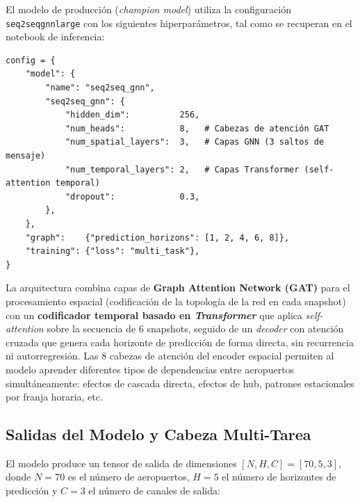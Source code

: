 \documentclass[12pt,oneside,a4paper]{report}
\renewcommand{\_}{\textunderscore\allowbreak}
\begin{document}
El modelo de producción (\textit{champion model}) utiliza la configuración \texttt{seq2seq\_gnn\_large} con los siguientes hiperparámetros, tal como se recuperan en el notebook de inferencia:

\begin{lstlisting}[style=pystyle, caption={Configuración del modelo Seq2SeqGNN campeón.}]
config = {
    "model": {
        "name": "seq2seq_gnn",
        "seq2seq_gnn": {
            "hidden_dim":          256,
            "num_heads":           8,   # Cabezas de atención GAT
            "num_spatial_layers":  3,   # Capas GNN (3 saltos de mensaje)
            "num_temporal_layers": 2,   # Capas Transformer (self-attention temporal)
            "dropout":             0.3,
        },
    },
    "graph":    {"prediction_horizons": [1, 2, 4, 6, 8]},
    "training": {"loss": "multi_task"},
}
\end{lstlisting}

La arquitectura combina capas de \textbf{Graph Attention Network (GAT)} para el procesamiento espacial (codificación de la topología de la red en cada snapshot) con un \textbf{codificador temporal basado en \textit{Transformer}} que aplica \textit{self-attention} sobre la secuencia de 6 snapshots, seguido de un \textit{decoder} con atención cruzada que genera cada horizonte de predicción de forma directa, sin recurrencia ni autorregresión. Las 8 cabezas de atención del encoder espacial permiten al modelo aprender diferentes tipos de dependencias entre aeropuertos simultáneamente: efectos de cascada directa, efectos de hub, patrones estacionales por franja horaria, etc.

\subsection{Salidas del Modelo y Cabeza Multi-Tarea}
\label{sub:salidas_modelo}

El modelo produce un tensor de salida de dimensiones $[N, H, C] = [70, 5, 3]$, donde $N=70$ es el número de aeropuertos, $H=5$ el número de horizontes de predicción y $C=3$ el número de canales de salida:
\end{document}
